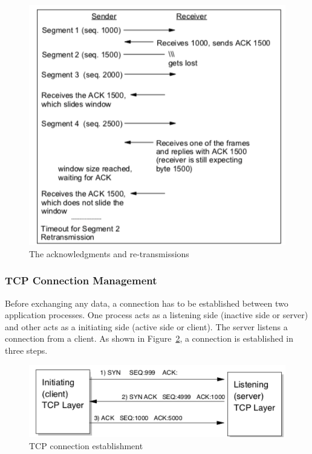 \documentclass[a4paper, 11pt]{article}
\begin{document}
\begin{figure}[h]
\includegraphics[scale=0.6]{ack-and-retransmit.png}
\caption{The acknowledgments and re-transmissions}
\label{fig:ack-retransmit}
\end{figure}

\subsubsection{TCP Connection Management}
Before exchanging any data, a connection has to be established between two application processes. One process acts as a listening side (inactive side or server) and other acts as a initiating side (active side or client). The server listens a connection from a client. As shown in Figure~\ref{fig:tcp-connection-establish}, a connection is established in three steps.

\begin{figure}[h]
\includegraphics[scale=0.6]{tcp-connection-establish.png}
\caption{TCP connection establishment}
\label{fig:tcp-connection-establish}
\end{figure}
\end{document}

